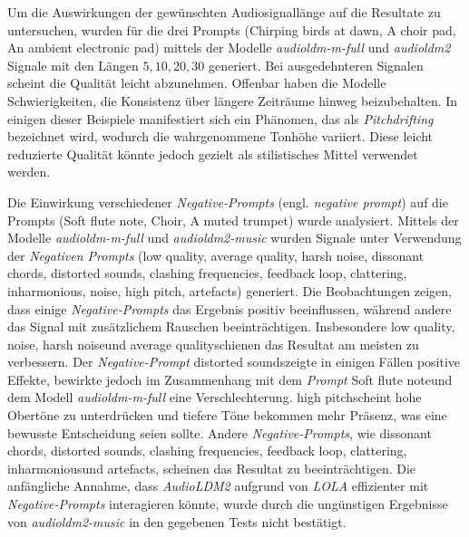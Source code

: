 \documentclass[
  a4paper,  %
  twoside,  %
  bibliography=totoc,
  headsepline,
  cleardoublepage=empty,
  parskip=half,
  draft=false
]{scrbook}
\begin{document}
Um die Auswirkungen der gewünschten Audiosignallänge auf die Resultate zu untersuchen, wurden für die drei Prompts (\glqq Chirping birds at dawn\grqq, \glqq A choir pad\grqq, \glqq An ambient electronic pad\grqq) mittels der Modelle \emph{audioldm-m-full} \cite{noauthor_cvsspaudioldm-m-full_nodate} und \emph{audioldm2} \cite{noauthor_cvsspaudioldm2_nodate} Signale mit den Längen $5,10,20,30$ generiert. Bei ausgedehnteren Signalen scheint die Qualität leicht abzunehmen. Offenbar haben die Modelle Schwierigkeiten, die Konsistenz über längere Zeiträume hinweg beizubehalten. In einigen dieser Beispiele manifestiert sich ein Phänomen, das als \emph{Pitchdrifting} bezeichnet wird, wodurch die wahrgenommene Tonhöhe variiert. Diese leicht reduzierte Qualität könnte jedoch gezielt als stilistisches Mittel verwendet werden.

Die Einwirkung verschiedener \emph{Negative-Prompts} (engl. \emph{negative prompt}) auf die Prompts (\glqq Soft flute note\grqq, \glqq Choir\grqq, \glqq A muted trumpet\grqq) wurde analysiert. Mittels der Modelle \emph{audioldm-m-full} \cite{noauthor_cvsspaudioldm-m-full_nodate} und \emph{audioldm2-music} \cite{noauthor_cvsspaudioldm2-music_nodate} wurden Signale unter Verwendung der \emph{Negativen Prompts} (\glqq low quality\grqq, \glqq average quality\grqq, \glqq harsh noise\grqq, \glqq dissonant chords\grqq, \glqq distorted sounds\grqq, \glqq clashing frequencies\grqq, \glqq feedback loop\grqq, \glqq clattering\grqq, \glqq inharmonious\grqq, \glqq noise\grqq, \glqq high pitch\grqq, \glqq artefacts\grqq) generiert. Die Beobachtungen zeigen, dass einige \emph{Negative-Prompts} das Ergebnis positiv beeinflussen, während andere das Signal mit zusätzlichem Rauschen beeinträchtigen. Insbesondere \glqq low quality\grqq, \glqq noise\grqq, \glqq harsh noise\grqq und \glqq average quality\grqq schienen das Resultat am meisten zu verbessern. Der \emph{Negative-Prompt} \glqq distorted sounds\grqq zeigte in einigen Fällen positive Effekte, bewirkte jedoch im Zusammenhang mit dem \emph{Prompt} \glqq Soft flute note\grqq und dem Modell \emph{audioldm-m-full} eine Verschlechterung. \glqq high pitch\grqq scheint hohe Obertöne zu unterdrücken und tiefere Töne bekommen mehr Präsenz, was eine bewusste Entscheidung seien sollte. Andere \emph{Negative-Prompts}, wie \glqq dissonant chords\grqq, \glqq distorted sounds\grqq, \glqq clashing frequencies\grqq, \glqq feedback loop\grqq, \glqq clattering\grqq, \glqq inharmonious\grqq und \glqq artefacts\grqq, scheinen das Resultat zu beeinträchtigen. Die anfängliche Annahme, dass \emph{AudioLDM2} aufgrund von \emph{LOLA} effizienter mit \emph{Negative-Prompts} interagieren könnte, wurde durch die ungünstigen Ergebnisse von \emph{audioldm2-music} in den gegebenen Tests nicht bestätigt.
\end{document}
